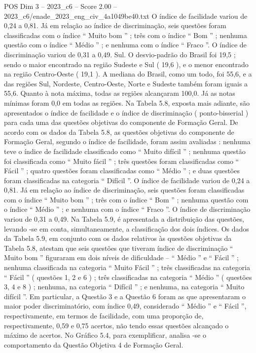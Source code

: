 \begin{textsample}{POS Dim 3 – 2023\_c6 – Score 2.00 – 2023\_c6/enade\_2023\_eng\_civ\_4a1049be40.txt}
O índice de facilidade variou de 0,24 a 0,81.
Já em relação ao índice de discriminação, seis questões foram classificadas com o índice “ Muito bom ” ; três com o índice “ Bom ” ; nenhuma questão com o índice “ Médio ” ; e nenhuma com o índice “ Fraco ”.
O índice de discriminação variou de 0,31 a 0,49.
Sul.
O desvio-padrão do Brasil foi 19,5 ; sendo o maior encontrado na região Sudeste e Sul ( 19,6 ), e o menor encontrado na região Centro-Oeste ( 19,1 ).
A mediana do Brasil, como um todo, foi 55,6, e a das regiões Sul, Nordeste, Centro-Oeste, Norte e Sudeste também foram iguais a 55,6.
Quanto à nota máxima, todas as regiões alcançaram 100,0.
Já as notas mínimas foram 0,0 em todas as regiões.
Na Tabela 5.8, exposta mais adiante, são apresentados o índice de facilidade e o índice de discriminação ( ponto-bisserial ) para cada uma das questões objetivas do componente de Formação Geral.
De acordo com os dados da Tabela 5.8, as questões objetivas do componente de Formação Geral, segundo o índice de facilidade, foram assim avaliadas : nenhuma teve o índice de facilidade classificado como “ Muito difícil ” ; nenhuma questão foi classificada como “ Muito fácil ” ; três questões foram classificadas como “ Fácil ” ; quatro questões foram classificadas como “ Médio ” ; e duas questões foram classificadas na categoria “ Difícil ”.
O índice de facilidade variou de 0,24 a 0,81.
Já em relação ao índice de discriminação, seis questões foram classificadas com o índice “ Muito bom ” ; três com o índice “ Bom ” ; nenhuma questão com o índice “ Médio ” ; e nenhuma com o índice “ Fraco ”.
O índice de discriminação variou de 0,31 a 0,49.
Na Tabela 5.9, é apresentada a distribuição das questões, levando -se em conta, simultaneamente, a classificação dos dois índices.
Os dados da Tabela 5.9, em conjunto com os dados relativos às questões objetivas da Tabela 5.8, atestam que seis questões que tiveram índice de discriminação “ Muito bom ” figuraram em dois níveis de dificuldade – “ Médio ” e “ Fácil ” ; nenhuma classificada na categoria “ Muito Fácil ” ; três classificadas na categoria “ Fácil ” ( questões 1, 2 e 6 ) ; três classificadas na categoria “ Médio ” ( questões 3, 4 e 8 ) ; nenhuma, na categoria “ Difícil ” ; e nenhuma, na categoria “ Muito difícil ”.
Em particular, a Questão 3 e a Questão 6 foram as que apresentaram o maior poder discriminatório, com índice 0,49, considerado “ Médio ” e “ Fácil ”, respectivamente, em termos de facilidade, com uma proporção de, respectivamente, 0,59 e 0,75 acertos, não tendo essas questões alcançado o máximo de acertos.
No Gráfico 5.4, para exemplificar, analisa -se o comportamento da Questão Objetiva 4 de Formação Geral.

\end{textsample}
